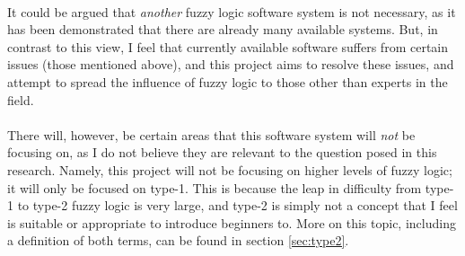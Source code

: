 \\
It could be argued that \textit{another} fuzzy logic software system is not necessary, as it has been demonstrated that there are already many available systems. But, in contrast to this view, I feel that currently available software suffers from certain issues (those mentioned above), and this project aims to resolve these issues, and attempt to spread the influence of fuzzy logic to those other than experts in the field.\\
\\
There will, however, be certain areas that this software system will \textit{not} be focusing on, as I do not believe they are relevant to the question posed in this research. Namely, this project will not be focusing on higher levels of fuzzy logic; it will only be focused on type-1. This is because the leap in difficulty from type-1 to type-2 fuzzy logic is very large, and type-2 is simply not a concept that I feel is suitable or appropriate to introduce beginners to. More on this topic, including a definition of both terms, can be found in section \ref{sec:type2}.\\


\newpage 